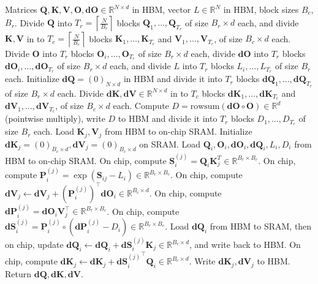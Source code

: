 \begin{algorithm}[h]
  \caption{\small\label{alg:flash_bwd}\textsc{FlashAttention-2} Backward Pass}
  \begin{algorithmic}[1]
    \REQUIRE Matrices $\mathbf{Q}, \mathbf{K}, \mathbf{V}, \mathbf{O}, \mathbf{dO} \in \mathbb{R}^{N \times d}$ in HBM, vector $L \in \mathbb{R}^N$ in HBM, block sizes $B_c$, $B_r$.
    \STATE Divide $\mathbf{Q}$ into $T_r = \left\lceil\frac{N}{B_r} \right\rceil$ blocks $\mathbf{Q}_1, \dots, \mathbf{Q}_{T_r}$ of size $B_r \times d$ each, and divide $\mathbf{K}, \mathbf{V}$ in to $T_c = \left\lceil \frac{N}{B_c} \right\rceil$ blocks $\mathbf{K}_1, \dots, \mathbf{K}_{T_c}$ and
    $\mathbf{V}_1, \dots, \mathbf{V}_{T_c}$, of size $B_c \times d$ each.
    \STATE Divide $\mathbf{O}$ into $T_r$ blocks $\mathbf{O}_i, \dots, \mathbf{O}_{T_r}$ of size $B_r \times d$ each, divide $\mathbf{dO}$ into $T_r$ blocks $\mathbf{dO}_i, \dots, \mathbf{dO}_{T_r}$
    of size $B_r \times d$ each, and divide $L$ into $T_r$ blocks $L_i, \dots, L_{T_r}$ of size $B_r$ each.
    \STATE Initialize $\mathbf{dQ} = (0)_{N \times d}$ in HBM and divide it into $T_r$ blocks $\mathbf{dQ}_1, \dots, \mathbf{dQ}_{T_r}$ of size $B_r \times d$ each. Divide $\mathbf{dK}, \mathbf{dV} \in \mathbb{R}^{N \times d}$ in to $T_c$ blocks $\mathbf{dK}_1, \dots, \mathbf{dK}_{T_c}$ and
    $\mathbf{dV}_1, \dots, \mathbf{dV}_{T_c}$, of size $B_c \times d$ each.
    \STATE Compute $D = \mathrm{rowsum}(\mathbf{dO} \circ \mathbf{O}) \in \mathbb{R}^d$ (pointwise multiply), write $D$ to HBM and divide it into $T_r$ blocks $D_1, \dots, D_{T_r}$ of size $B_r$ each.
      \STATE Load $\mathbf{K}_j, \mathbf{V}_j$ from HBM to on-chip SRAM.
      \STATE Initialize $\mathbf{dK}_j = (0)_{B_c \times d}, \mathbf{dV}_j = (0)_{B_c \times d}$ on SRAM.
        \STATE Load $\mathbf{Q}_i, \mathbf{O}_i, \mathbf{dO}_i, \mathbf{dQ}_i, L_i, D_i$ from HBM to on-chip SRAM.
        \STATE On chip, compute $\mathbf{S}_{i}^{(j)} = \mathbf{Q}_i \mathbf{K}_j^T \in \mathbb{R}^{B_r \times B_c}$.
        \STATE On chip, compute $\mathbf{P}_{i}^{(j)} = \exp(\mathbf{S}_{ij} - L_{i}) \in \mathbb{R}^{B_r \times B_c}$.
        \STATE On chip, compute
        $\mathbf{dV}_j \leftarrow \mathbf{dV}_j + (\mathbf{P}_{i}^{(j)})^\top \mathbf{dO}_i \in \mathbb{R}^{B_c \times d}$.
        \STATE On chip, compute
        $\mathbf{dP}_{i}^{(j)} = \mathbf{dO}_{i} \mathbf{V}_j^\top \in \mathbb{R}^{B_r \times B_c}$.
        \STATE On chip, compute $\mathbf{dS}_{i}^{(j)} = \mathbf{P}_{i}^{(j)} \circ (\mathbf{dP}_{i}^{(j)} - D_i) \in \mathbb{R}^{B_r \times B_c}$.
        \STATE Load $\mathbf{dQ}_i$ from HBM to SRAM, then on chip, update
        $\mathbf{dQ}_{i} \leftarrow \mathbf{dQ}_i + \mathbf{dS}_{i}^{(j)} \mathbf{K}_j \in \mathbb{R}^{B_r \times d}$, and write back to HBM.
        \STATE On chip, compute $\mathbf{dK}_{j} \leftarrow \mathbf{dK}_j + {\mathbf{dS}_{i}^{(j)}}^\top \mathbf{Q}_i \in \mathbb{R}^{B_c \times d}$.
      \ENDFOR
      \STATE Write $\mathbf{dK}_j, \mathbf{dV}_j$ to HBM.
    \ENDFOR
    \STATE Return $\mathbf{dQ}, \mathbf{dK}, \mathbf{dV}$.
  \end{algorithmic}
\end{algorithm}

